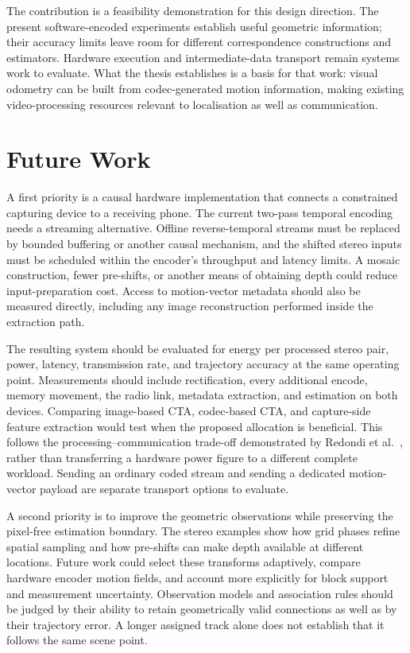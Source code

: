 The contribution is a feasibility demonstration for this design direction.
The present software-encoded experiments establish useful geometric information;
their accuracy limits leave room for different correspondence constructions and
estimators. Hardware execution and intermediate-data transport remain systems
work to evaluate. What the thesis establishes is a basis for that work: visual
odometry can be built from codec-generated motion information, making existing
video-processing resources relevant to localisation as well as communication.

\section{Future Work}

A first priority is a causal hardware implementation that connects a constrained
capturing device to a receiving phone. The current two-pass temporal encoding
needs a streaming alternative. Offline reverse-temporal streams must be
replaced by bounded buffering or another causal mechanism, and
the shifted stereo inputs must be scheduled within the encoder's throughput
and latency limits. A mosaic construction, fewer pre-shifts, or another means
of obtaining depth could reduce input-preparation cost. Access to motion-vector
metadata should also be measured directly, including any image reconstruction
performed inside the extraction path.

The resulting system should be evaluated for energy per processed stereo pair,
power, latency, transmission rate, and trajectory accuracy at the same operating
point. Measurements should include rectification, every additional encode,
memory movement, the radio link, metadata extraction, and estimation on both
devices. Comparing image-based CTA, codec-based CTA, and capture-side feature
extraction would test when the proposed allocation is beneficial. This follows
the processing--communication trade-off demonstrated by Redondi et
al.~\cite{redondi2016cta}, rather than transferring a hardware power figure to
a different complete workload. Sending an ordinary coded stream and sending a
dedicated motion-vector payload are separate transport options to evaluate.

A second priority is to improve the geometric observations while preserving
the pixel-free estimation boundary. The stereo examples show how grid phases
refine spatial sampling and how pre-shifts can make depth available at different
locations. Future work could select these transforms adaptively, compare hardware
encoder motion fields, and account more explicitly for block support and
measurement uncertainty. Observation models and association rules should be
judged by their ability to retain geometrically valid connections as well as
by their trajectory error. A longer assigned track alone does not establish
that it follows the same scene point.

